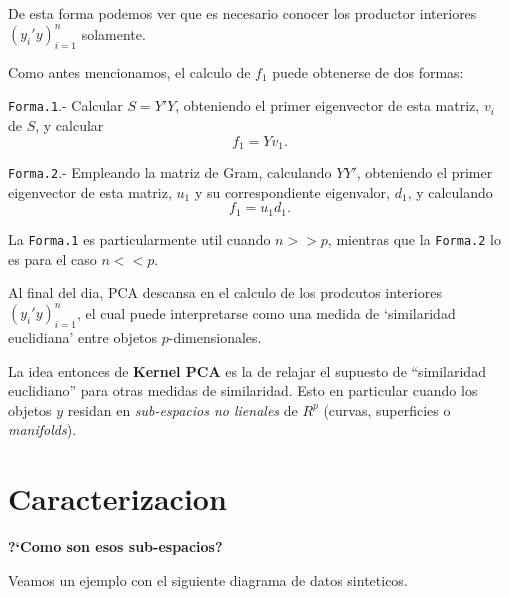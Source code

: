 \documentclass[11pt,]{article}
\begin{document}
De esta forma podemos ver que es necesario conocer los productor
interiores \((y_{i}'y)_{i=1}^{n}\) solamente.

Como antes mencionamos, el calculo de \(f_{1}\) puede obtenerse de dos
formas:

\texttt{Forma.1}.- Calcular \(S=Y'Y\), obteniendo el primer eigenvector
de esta matriz, \(v_{i}\) de \(S\), y calcular \[f_{1}=Yv_{1}.\]

\texttt{Forma.2}.- Empleando la matriz de Gram, calculando \(YY'\),
obteniendo el primer eigenvector de esta matriz, \(u_{1}\) y su
correspondiente eigenvalor, \(d_{1}\), y calculando
\[f_{1}=u_{1}d_{1}.\]

La \texttt{Forma.1} es particularmente util cuando \(n>>p\), mientras
que la \texttt{Forma.2} lo es para el caso \(n<<p\).

Al final del dia, PCA descansa en el calculo de los prodcutos interiores
\((y_{i}'y)_{i=1}^{n}\), el cual puede interpretarse como una medida de
`similaridad euclidiana' entre objetos \(p\)-dimensionales.

La idea entonces de \textbf{Kernel PCA} es la de relajar el supuesto de
``similaridad euclidiano'' para otras medidas de similaridad. Esto en
particular cuando los objetos \(y\) residan en \emph{sub-espacios no
lienales} de \(R^{p}\) (curvas, superficies o \emph{manifolds}).

\section{Caracterizacion}\label{caracterizacion}

\textbf{?`Como son esos sub-espacios?}

Veamos un ejemplo con el siguiente diagrama de datos sinteticos.
\end{document}
